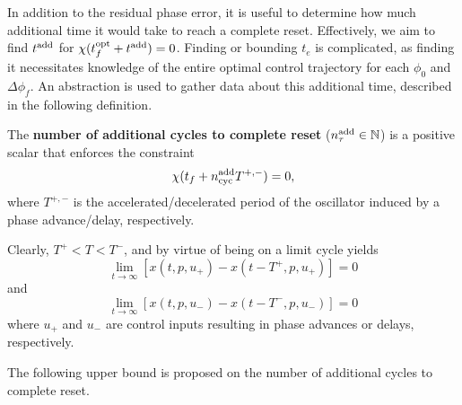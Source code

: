 In addition to the residual phase error, it is useful to determine how much additional time it would take to reach a complete reset.
Effectively, we aim to find $t^{\rm add}$ for $\chi(t^{\rm opt}_f+t^{\rm add}) = 0$.
Finding or bounding $t_e$ is complicated, as finding it necessitates knowledge of the entire optimal control trajectory for each $\phi_0$ and $\Delta\phi_f$. An abstraction is used to gather data about this additional time, described in the following definition.
\begin{defn}
The \textbf{number of additional cycles to complete reset} ($n^{\rm add}_\tau\in\mathbb{N}$) is a positive scalar that enforces the constraint
\[
\chi(t_f+n_{\rm cyc}^{\rm add}T^{+,-})=0,
\]
where $T^{+,-}$ is the accelerated/decelerated period of the oscillator induced by a phase advance/delay, respectively.
\end{defn}
\begin{rmk}
Clearly, $T^{+} < T < T^{-}$, and by virtue of being on a limit cycle yields
\begin{equation*}
\lim_{t\to\infty}[x(t,p,u_+) - x(t-T^{+},p,u_+)]=0
\end{equation*}
and
\begin{equation*}
\lim_{t\to\infty}[x(t,p,u_{-}) - x(t-T^{-},p,u_{-})]=0
\end{equation*}
where $u_+$ and $u_-$ are control inputs resulting in phase advances or delays, respectively.
\end{rmk}

The following upper bound is proposed on the number of additional cycles to complete reset.

